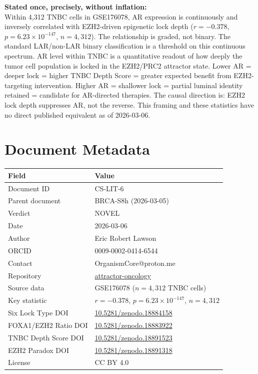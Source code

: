 \documentclass[12pt, a4paper]{article}
\begin{document}
\begin{center}
\colorbox{findingbox}{
\begin{minipage}{0.88\textwidth}
\vspace{0.6em}
\textbf{Stated once, precisely, without inflation:}
\\[0.5em]
Within 4,312 TNBC cells in GSE176078,
AR expression is continuously and inversely
correlated with EZH2-driven epigenetic lock
depth ($r = -0.378$, $p = 6.23 \times 10^{-147}$,
$n = 4{,}312$). The relationship is graded, not
binary. The standard LAR/non-LAR binary
classification is a threshold on this continuous
spectrum. AR level within TNBC is a quantitative
readout of how deeply the tumor cell population
is locked in the EZH2/PRC2 attractor state.
Lower AR = deeper lock = higher TNBC Depth Score
= greater expected benefit from EZH2-targeting
intervention. Higher AR = shallower lock =
partial luminal identity retained = candidate
for AR-directed therapies. The causal direction
is: EZH2 lock depth suppresses AR, not the
reverse. This framing and these statistics have
no direct published equivalent as of 2026-03-06.
\vspace{0.5em}
\end{minipage}}
\end{center}

\section{Document Metadata}

\begin{tabular}{ll}
\toprule
\textbf{Field} & \textbf{Value} \\
\midrule
Document ID & CS-LIT-6 \\
Parent document & BRCA-S8h (2026-03-05) \\
Verdict & NOVEL \\
Date & 2026-03-06 \\
Author & Eric Robert Lawson \\
ORCID & 0009-0002-0414-6544 \\
Contact & OrganismCore@proton.me \\
Repository &
\href{https://github.com/Eric-Robert-Lawson/attractor-oncology}
{attractor-oncology} \\
Source data & GSE176078 ($n=4{,}312$ TNBC cells) \\
Key statistic &
$r=-0.378$, $p=6.23\times10^{-147}$,
$n=4{,}312$ \\
Six Lock Type DOI &
\href{https://doi.org/10.5281/zenodo.18884158}
{10.5281/zenodo.18884158} \\
FOXA1/EZH2 Ratio DOI &
\href{https://doi.org/10.5281/zenodo.18883922}
{10.5281/zenodo.18883922} \\
TNBC Depth Score DOI &
\href{https://doi.org/10.5281/zenodo.18891523}
{10.5281/zenodo.18891523} \\
EZH2 Paradox DOI &
\href{https://doi.org/10.5281/zenodo.18891318}
{10.5281/zenodo.18891318} \\
License & CC BY 4.0 \\
\bottomrule
\end{tabular}
\end{document}
